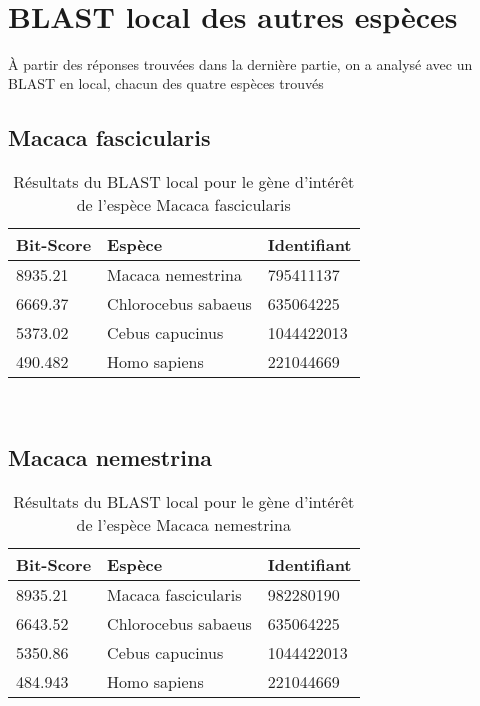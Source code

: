 \documentclass[a4paper]{article}
\begin{document}
\begin{multicols}{2}
\begin{table}[H]
\begin{tabular}{lll}
\bottomrule
\end{tabular}\\[10pt]
\end{table}

\section{BLAST local des autres espèces}
À partir des réponses trouvées dans la dernière partie, on a analysé avec un BLAST en local, chacun des quatre espèces trouvés

\subsection{Macaca fascicularis}
\begin{table}[H]
\small\sf\centering
\caption{Résultats du BLAST local pour le gène d'intérêt de l'espèce Macaca fascicularis}
\begin{tabular}{lll}
\toprule
Bit-Score&Espèce&Identifiant\\
\midrule
8935.21 & Macaca nemestrina & 795411137\\
6669.37 & Chlorocebus sabaeus & 635064225\\
5373.02 & Cebus capucinus & 1044422013\\
490.482 & Homo sapiens & 221044669\\

\bottomrule
\end{tabular}\\[10pt]
\end{table}

\subsection{Macaca nemestrina}
\begin{table}[H]
\small\sf\centering
\caption{Résultats du BLAST local pour le gène d'intérêt de l'espèce Macaca nemestrina}
\begin{tabular}{lll}
\toprule
Bit-Score&Espèce&Identifiant\\
\midrule
8935.21 & Macaca fascicularis & 982280190\\
6643.52 & Chlorocebus sabaeus & 635064225\\
5350.86 & Cebus capucinus & 1044422013\\
484.943 & Homo sapiens & 221044669\\

\bottomrule
\end{tabular}\\[10pt]
\end{table}


\end{multicols}
\end{document}
